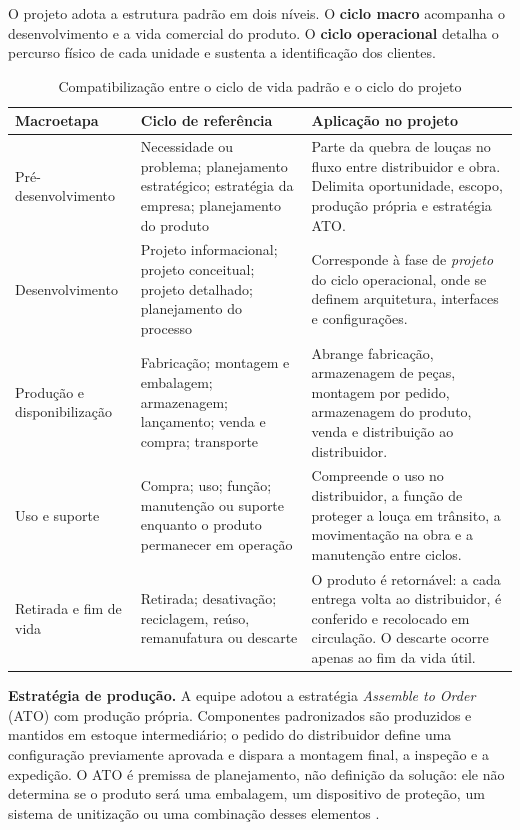 O projeto adota a estrutura padrão em dois níveis. O \textbf{ciclo macro} acompanha o desenvolvimento e a vida comercial do produto. O \textbf{ciclo operacional} detalha o percurso físico de cada unidade e sustenta a identificação dos clientes.

\begin{table}[H]
\caption{Compatibilização entre o ciclo de vida padrão e o ciclo do projeto}
\label{tab:ciclo-vida-macro}
\centering
\footnotesize
\begin{tabularx}{\textwidth}{@{}L{2.65cm}@{\hspace{0.4cm}}L{4.2cm}@{\hspace{0.4cm}}Y@{}}
\toprule
\textbf{Macroetapa} & \textbf{Ciclo de referência} & \textbf{Aplicação no projeto} \\
\midrule
Pré-desenvolvimento & Necessidade ou problema; planejamento estratégico; estratégia da empresa; planejamento do produto & Parte da quebra de louças no fluxo entre distribuidor e obra. Delimita oportunidade, escopo, produção própria e estratégia ATO. \\
Desenvolvimento & Projeto informacional; projeto conceitual; projeto detalhado; planejamento do processo & Corresponde à fase de \textit{projeto} do ciclo operacional, onde se definem arquitetura, interfaces e configurações. \\
Produção e disponibilização & Fabricação; montagem e embalagem; armazenagem; lançamento; venda e compra; transporte & Abrange fabricação, armazenagem de peças, montagem por pedido, armazenagem do produto, venda e distribuição ao distribuidor. \\
Uso e suporte & Compra; uso; função; manutenção ou suporte enquanto o produto permanecer em operação & Compreende o uso no distribuidor, a função de proteger a louça em trânsito, a movimentação na obra e a manutenção entre ciclos. \\
Retirada e fim de vida & Retirada; desativação; reciclagem, reúso, remanufatura ou descarte & O produto é retornável: a cada entrega volta ao distribuidor, é conferido e recolocado em circulação. O descarte ocorre apenas ao fim da vida útil. \\
\bottomrule
\end{tabularx}
\end{table}

\noindent\textbf{Estratégia de produção.} A equipe adotou a estratégia \textit{Assemble to Order} (ATO) com produção própria. Componentes padronizados são produzidos e mantidos em estoque intermediário; o pedido do distribuidor define uma configuração previamente aprovada e dispara a montagem final, a inspeção e a expedição. O ATO é premissa de planejamento, não definição da solução: ele não determina se o produto será uma embalagem, um dispositivo de proteção, um sistema de unitização ou uma combinação desses elementos \citep{rozenfeld2006}.

